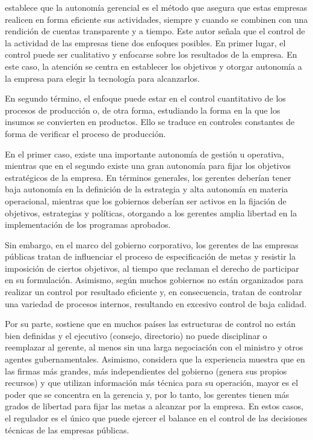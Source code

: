 \documentclass[
  12pt,
  spanish,
]{book}
\begin{document}
\citet{Ramamurti1991} establece que la autonomía gerencial es el método
que asegura que estas empresas realicen en forma eficiente sus
actividades, siempre y cuando se combinen con una rendición de cuentas
transparente y a tiempo. Este autor señala que el control de la
actividad de las empresas tiene dos enfoques posibles. En primer lugar,
el control puede ser cualitativo y enfocarse sobre los resultados de la
empresa. En este caso, la atención se centra en establecer los objetivos
y otorgar autonomía a la empresa para elegir la tecnología para
alcanzarlos.

En segundo término, el enfoque puede estar en el control cuantitativo de
los procesos de producción o, de otra forma, estudiando la forma en la
que los insumos se convierten en productos. Ello se traduce en controles
constantes de forma de verificar el proceso de producción.

En el primer caso, existe una importante autonomía de gestión u
operativa, mientras que en el segundo existe una gran autonomía para
fijar los objetivos estratégicos de la empresa. En términos generales,
los gerentes deberían tener baja autonomía en la definición de la
estrategia y alta autonomía en materia operacional, mientras que los
gobiernos deberían ser activos en la fijación de objetivos, estrategias
y políticas, otorgando a los gerentes amplia libertad en la
implementación de los programas aprobados.

Sin embargo, en el marco del gobierno corporativo, los gerentes de las
empresas públicas tratan de influenciar el proceso de especificación de
metas y resistir la imposición de ciertos objetivos, al tiempo que
reclaman el derecho de participar en su formulación. Asimismo, según
\citet{Jones1991} muchos gobiernos no están organizados para realizar un
control por resultado eficiente y, en consecuencia, tratan de controlar
una variedad de procesos internos, resultando en excesivo control de
baja calidad.

Por su parte, \citet{Aharoni1982} sostiene que en muchos países las
estructuras de control no están bien definidas y el ejecutivo (consejo,
directorio) no puede disciplinar o reemplazar al gerente, al menos sin
una larga negociación con el ministro y otros agentes gubernamentales.
Asimismo, considera que la experiencia muestra que en las firmas más
grandes, más independientes del gobierno (genera sus propios recursos) y
que utilizan información más técnica para su operación, mayor es el
poder que se concentra en la gerencia y, por lo tanto, los gerentes
tienen más grados de libertad para fijar las metas a alcanzar por la
empresa. En estos casos, el regulador es el único que puede ejercer el
balance en el control de las decisiones técnicas de las empresas
públicas.
\end{document}
